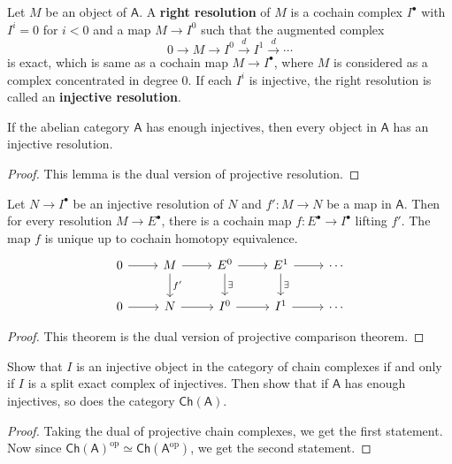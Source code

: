 \begin{defn}
Let $M$ be an object of $\mathsf{A}$. A \textbf{right resolution} of $M$ is a cochain complex $I^\bullet$ with $I^i=0$ for $i<0$ and a map $M\rightarrow I^0$ such that the augmented complex
\begin{equation}
0\rightarrow M\rightarrow I^0\xrightarrow{d} I^1\xrightarrow{d}\cdots
\end{equation}
is exact, which is same as a cochain map $M\rightarrow I^\bullet$, where $M$ is considered as a complex concentrated in degree 0. If each $I^i$ is injective, the right resolution is called an \textbf{injective resolution}.
\end{defn}

\begin{lemma} If the abelian category $\mathsf{A}$ has enough injectives, then every object in $\mathsf{A}$ has an injective resolution.
\end{lemma}
\begin{proof}
This lemma is the dual version of projective resolution.
\end{proof}

\begin{thm} Let $N\rightarrow I^\bullet$ be an injective resolution of $N$ and $f':M\rightarrow N$ be a map in $\mathsf{A}$. Then for every resolution $M\rightarrow E^\bullet$, there is a cochain map $f:E^\bullet\rightarrow I^\bullet$ lifting $f'$. The map $f$ is unique up to cochain homotopy equivalence.
\begin{equation}
\begin{tikzcd}
0\arrow[r] &M\arrow[r]\arrow{d}{f'} &E^0\arrow[r]\arrow{d}{\exists}&E^1\arrow[r]\arrow{d}{\exists}&\cdots\\
0\arrow[r]&N\arrow[r]&I^0\arrow[r]&I^1\arrow[r]&\cdots
\end{tikzcd}
\end{equation}
\end{thm}
\begin{proof}
This theorem is the dual version of projective comparison theorem.
\end{proof}

\begin{exer} Show that $I$ is an injective object in the category of chain complexes if and only if $I$ is a split exact complex of injectives. Then show that if $\mathsf{A}$ has enough injectives, so does the category $\mathsf{Ch}(\mathsf{A})$.
\end{exer}
\begin{proof}
Taking the dual of projective chain complexes, we get the first statement. Now since $\mathsf{Ch}(\mathsf{A})^\textrm{op}\simeq \mathsf{Ch}(\mathsf{A}^\textrm{op})$, we get the second statement.
\end{proof}

